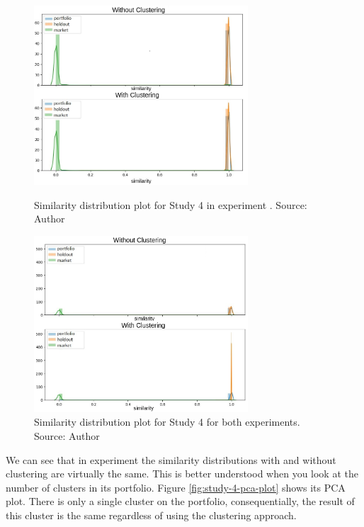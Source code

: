 \begin{figure}[!ht]
   \centering
   
   \includegraphics[width=8cm]{fig/ch4-study-4-comparsion-exp-i.png}
   \caption{Similarity distribution plot for Study 4 in experiment \nameExperimentI{}. Source: Author}
   \label{fig:study-4-comparsion-exp-i}

   \includegraphics[width=8cm]{fig/ch4-study-4-comparsion-exp-ii.png}
   \caption{Similarity distribution plot for Study 4 for both experiments. Source: Author}
   \label{fig:study-4-comparsion-exp-ii}
\end{figure}

We can see that in experiment \nameExperimentI{} the similarity distributions with and without clustering are virtually the same. This is better understood when you look at the number of clusters in its portfolio. Figure \ref{fig:study-4-pca-plot} shows its PCA plot. There is only a single cluster on the portfolio, consequentially, the result of this cluster is the same regardless of using the clustering approach.

